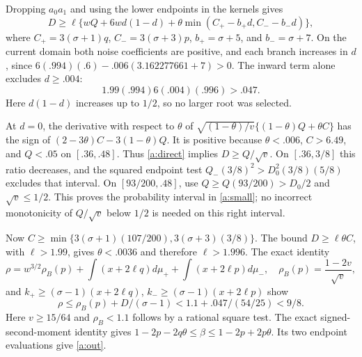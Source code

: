 \documentclass[11pt]{article}
\begin{document}
Dropping $a_0a_1$ and using the lower endpoints in the kernels gives
\begin{equation}\label{a:direct}
 D\ge\ell\{wQ+6wd(1-d)+\theta\min(C_+-b_+d,C_--b_-d)\},
\end{equation}
where $C_+=3(\sigma+1)q$, $C_-=3(\sigma+3)p$,
$b_+=\sigma+5$, and $b_-=\sigma+7$.
On the current domain both noise coefficients are positive, and each
branch increases in $d$, since
$6(.994)(.6)-.006(3.162277661+7)>0$.
The inward term alone excludes $d\ge.004$:
\[
        1.99(.994)6(.004)(.996)>.047.
\]
Here $d(1-d)$ increases up to $1/2$, so no larger root was selected.

At $d=0$, the derivative with respect to $\theta$ of
$\sqrt{(1-\theta)/v}\{(1-\theta)Q+\theta C\}$ has the sign of
$(2-3\theta)C-3(1-\theta)Q$. It is positive because
$\theta<.006$, $C>6.49$, and $Q<.05$ on $[.36,.48]$.
Thus \eqref{a:direct} implies $D\ge Q/\sqrt v$.
On $[.36,3/8]$ this ratio decreases, and the squared endpoint test
$Q_-(3/8)^2>D_0^2(3/8)(5/8)$ excludes that interval.
On $[93/200,.48]$, use $Q\ge Q(93/200)>D_0/2$ and $\sqrt v\le1/2$.
This proves the probability interval in \eqref{a:small}; no incorrect
monotonicity of $Q/\sqrt v$ below $1/2$ is needed on this right interval.

Now $C\ge\min\{3(\sigma+1)(107/200),3(\sigma+3)(3/8)\}$.
The bound $D\ge\ell\theta C$, with $\ell>1.99$, gives
$\theta<.0036$ and therefore $\ell>1.996$.
The exact identity
\[
 \rho=w^{3/2}\rho_B(p)+\int(x+2\ell q)d\mu_+
                         +\int(x+2\ell p)d\mu_-,\quad
 \rho_B(p)=\frac{1-2v}{\sqrt v},
\]
and $k_+\ge(\sigma-1)(x+2\ell q)$,
$k_-\ge(\sigma-1)(x+2\ell p)$ show
\[
 \rho\le\rho_B(p)+D/(\sigma-1)
 <1.1+.047/(54/25)<9/8.
\]
Here $v\ge15/64$ and $\rho_B<1.1$ follows by a rational square test.
The exact signed-second-moment identity gives
$1-2p-2q\theta\le\beta\le1-2p+2p\theta$.
Its two endpoint evaluations give \eqref{a:out}.
\end{document}
